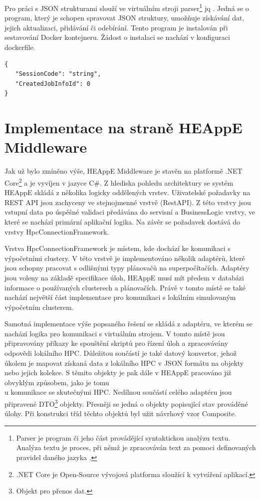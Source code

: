 Pro práci s JSON strukturami slouží ve virtuálním stroji parser\footnote{Parser je program či jeho část provádějící syntaktickou analýzu textu. Analýza textu je proces, při němž je zpracováván text za pomoci definovaných pravidel daného jazyka \cite{uEN4MdNhBpkZmkHF}.} jq \cite{qibOqajDMnKYNjXq}. Jedná se o program, který je schopen spravovat JSON struktury, umožňuje získávání dat, jejich aktualizaci, přidávání či odebírání. Tento program je instalován při sestavování Docker kontejneru. Žádost o instalaci se nachází v konfiguraci dockerfile.

\hfill \break
\begin{lstlisting}[caption={Příklad JSON struktury}]
{
   "SessionCode": "string",
   "CreatedJobInfoId": 0
}
\end{lstlisting}

\section{Implementace na straně HEAppE Middleware}
Jak už bylo zmíněno výše, HEAppE Middleware je stavěn na platformě .NET Core\footnote{.NET Core je Open-Source vývojová platforma sloužící k vytváření aplikací.} a je vyvíjen v jazyce C\#. Z hlediska pohledu architektury se systém HEAppE skládá z několika logicky oddělených vrstev. Uživatelské požadavky na REST API jsou zachyceny ve stejnojmenné vrstvě (RestAPI). Z této vrstvy jsou vstupní data po úspěšné validaci předávána do servisní a BusinessLogic vrstvy, ve které se nachází primární aplikační logika. Na závěr se požadavek dostává do vrstvy HpcConnectionFramework.

Vrstva HpcConnectionFramework je místem, kde dochází ke komunikaci s výpočetními clustery. V této vrstvě je implementováno několik adaptérů, které jsou schopny pracovat s odlišnými typy plánovačů na superpočítačích. Adaptéry jsou voleny na základě specifikace úloh, HEAppE musí mít předem v databázi informace o používaných clusterech a plánovačích. Právě v tomto místě se také nachází největší část implementace pro komunikaci s lokálním simulovaným výpočetním clusterem.

Samotná implementace výše popsaného řešení se skládá z adaptéru, ve kterém se nachází logika pro komunikaci s virtuálním strojem. V tomto místě jsou připravovány příkazy ke spouštění skriptů pro řízení úloh a zpracovávány odpovědi lokálního HPC. Důležitou součástí je také datový konvertor, jehož úkolem je mapovat získaná data z lokálního HPC v JSON formátu na objekty nebo jejich kolekce. S těmito objekty je pak dále v HEAppE pracováno již obvyklým způsobem, jako je tomu \\u komunikace se skutečnými HPC. Nedílnou součástí celého adaptéru jsou připravené DTO\footnote{Objekt pro přenos dat.} objekty. Přesněji se jedná o objekty popisující stav prováděné úlohy. Při konstrukci tříd těchto objektů byl užit návrhový vzor Composite.

